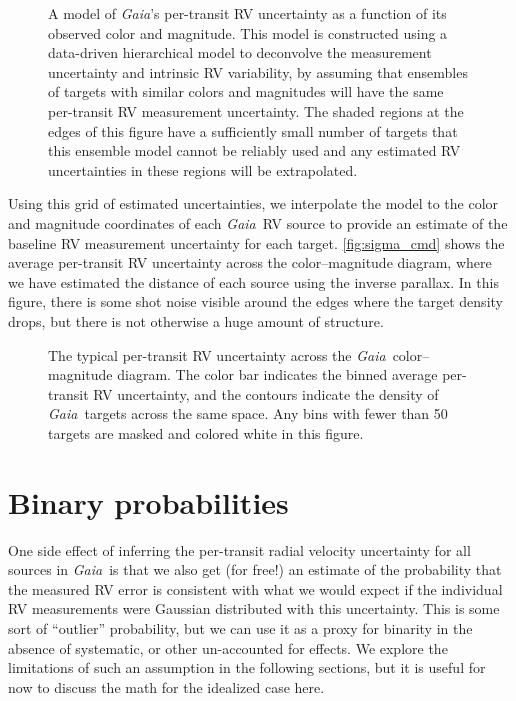 \documentclass[modern, letterpaper]{aastex63}
\newcommand{\project}[1]{\textsl{#1}}
\newcommand{\Gaia}{\project{Gaia}}
\begin{document}
\begin{figure}
	\caption{A model of \Gaia's per-transit RV uncertainty as a function of its observed color and magnitude.
		This model is constructed using a data-driven hierarchical model to deconvolve the measurement uncertainty and intrinsic RV variability, by assuming that ensembles of targets with similar colors and magnitudes will have the same per-transit RV measurement uncertainty.
		The shaded regions at the edges of this figure have a sufficiently small number of targets that this ensemble model cannot be reliably used and any estimated RV uncertainties in these regions will be extrapolated. \label{fig:noise_model}}
\end{figure}

Using this grid of estimated uncertainties, we interpolate the model to the color and magnitude coordinates of each \Gaia\ RV source to provide an estimate of the baseline RV measurement uncertainty for each target.
\autoref{fig:sigma_cmd} shows the average per-transit RV uncertainty across the color--magnitude diagram, where we have estimated the distance of each source using the inverse parallax.
In this figure, there is some shot noise visible around the edges where the target density drops, but there is not otherwise a huge amount of structure.

\begin{figure}
	\caption{The typical per-transit RV uncertainty across the \Gaia\ color--magnitude diagram.
		The color bar indicates the binned average per-transit RV uncertainty, and the contours indicate the density of \Gaia\ targets across the same space.
		Any bins with fewer than 50 targets are masked and colored white in this figure. \label{fig:sigma_cmd}}
\end{figure}

\section{Binary probabilities}

One side effect of inferring the per-transit radial velocity uncertainty for all sources in \Gaia\ is that we also get (for free!) an estimate of the probability that the measured RV error is consistent with what we would expect if the individual RV measurements were Gaussian distributed with this uncertainty.
This is some sort of ``outlier'' probability, but we can use it as a proxy for binarity in the absence of systematic, or other un-accounted for effects.
We explore the limitations of such an assumption in the following sections, but it is useful for now to discuss the math for the idealized case here.
\end{document}
